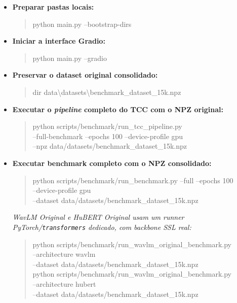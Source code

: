 \documentclass[12pt,a4paper]{article}
\begin{document}
\begin{itemize}
	\item \textbf{Preparar pastas locais:}
	\begin{quote}\footnotesize\ttfamily
		python main.py --bootstrap-dirs
	\end{quote}
	
	\item \textbf{Iniciar a interface Gradio:}
	\begin{quote}\footnotesize\ttfamily
		python main.py --gradio
	\end{quote}
	
	\item \textbf{Preservar o dataset original consolidado:}
	\begin{quote}\footnotesize\ttfamily
		dir data\textbackslash datasets\textbackslash benchmark\_dataset\_15k.npz
	\end{quote}
	
	\item \textbf{Executar o \textit{pipeline} completo do TCC com o NPZ original:}
	\begin{quote}\footnotesize\ttfamily
		python scripts/benchmark/run\_tcc\_pipeline.py\\
		--full-benchmark --epochs 100 --device-profile gpu\\
		--npz data/datasets/benchmark\_dataset\_15k.npz
	\end{quote}
	
	\item \textbf{Executar benchmark completo com o NPZ consolidado:}
	\begin{quote}\footnotesize\ttfamily
		python scripts/benchmark/run\_benchmark.py --full --epochs 100\\
		--device-profile gpu\\
		--dataset data/datasets/benchmark\_dataset\_15k.npz
	\end{quote}
	\textit{WavLM Original e HuBERT Original usam um \textit{runner}
		PyTorch/\texttt{transformers} dedicado, com \textit{backbone} SSL real:}
	\begin{quote}\footnotesize\ttfamily
		python scripts/benchmark/run\_wavlm\_original\_benchmark.py\\
		--architecture wavlm\\
		--dataset data/datasets/benchmark\_dataset\_15k.npz\\
		python scripts/benchmark/run\_wavlm\_original\_benchmark.py\\
		--architecture hubert\\
		--dataset data/datasets/benchmark\_dataset\_15k.npz
	\end{quote}
	

\end{itemize}
\end{document}
